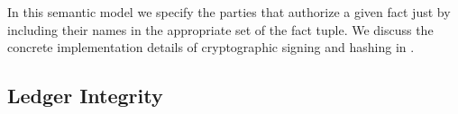 In this semantic model we specify the parties that authorize a given fact just by including their names in the appropriate set of the fact tuple. We discuss the concrete implementation details of cryptographic signing and hashing in \REF.


\subsection{Ledger Integrity}



